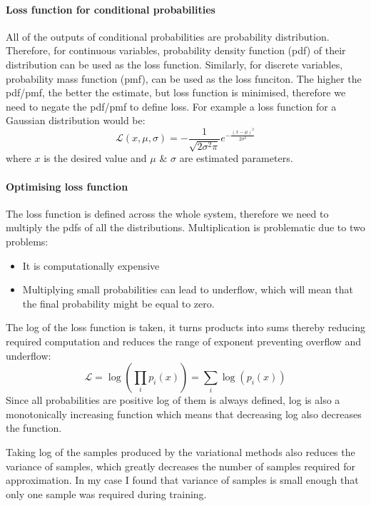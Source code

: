 \documentclass[12pt,a4paper]{book}
\begin{document}
\paragraph{Loss function for conditional probabilities}
All of the outputs of conditional probabilities are probability distribution.
Therefore, for continuous variables, probability density function (pdf) of their distribution can be used as the loss function.
Similarly, for discrete variables, probability mass function (pmf), can be used as the loss funciton.
The higher the pdf/pmf, the better the estimate, but loss function is minimised, therefore we need to negate the pdf/pmf to define loss.
For example a loss function for a Gaussian distribution would be:
\begin{equation}
\mathcal{L}(x,\mu,\sigma) = -\frac{1}{\sqrt{2\sigma^2\pi}}e^{-\frac{(x-\mu)^2}{2\sigma^2}}
\label{eq:gaussian-loss}
\end{equation}
where $x$ is the desired value and $\mu$ \& $\sigma$ are estimated parameters.

\paragraph{Optimising loss function}
The loss function is defined across the whole system, therefore we need to multiply the pdfs of all the distributions.
Multiplication is problematic due to two problems:
\begin{itemize}
\item It is computationally expensive
\item Multiplying small probabilities can lead to underflow, which will mean that the final probability might be equal to zero.
\end{itemize}
The log of the loss function is taken, it turns products into sums thereby reducing required computation and reduces the range of exponent preventing overflow and underflow:
\begin{equation*}
\mathcal{L} = \log\left(\prod_i p_i(x)\right) = \sum_i \log(p_i(x))
\end{equation*}
Since all probabilities are positive log of them is always defined, log is also a monotonically increasing function which means that decreasing log also decreases the function.

Taking log of the samples produced by the variational methods also reduces the variance of samples, which greatly decreases the number of samples required for approximation.
In my case I found that variance of samples is small enough that only one sample was required during training.
\end{document}
